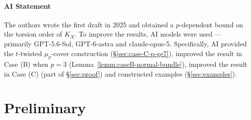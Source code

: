 \documentclass[10pt,abstract=true]{scrartcl}
\numberwithin{equation}{section}
\theoremstyle{definition}
\theoremstyle{remark}
\begin{document}
\medskip
\paragraph{AI Statement}
The authors wrote the first draft in 2025 and obtained a $p$-dependent bound on the torsion order of $K_X$.
To improve the results, AI models were used --- primarily GPT-5.6-Sol, GPT-6-astra and claude-opus-5.
Specifically, AI provided the $t$-twisted $\mu_p$-cover construction (\S\ref{sec:case-C-p-ge7}), improved the result in Case (B) when $p=3$ (Lemma~\ref{lemm:caseB-normal-bundle}), improved the result in Case (C) (part of \S\ref{sec:proof}) and constructed examples (\S\ref{sec:examples}).

\section{Preliminary}\label{sec:preliminary}
\end{document}
